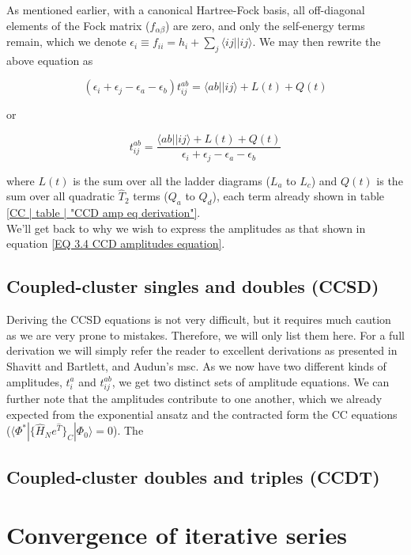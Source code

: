 \documentclass[10pt]{report}
\begin{document}
	As mentioned earlier, with a canonical Hartree-Fock basis, all off-diagonal elements of the Fock matrix ($f_{\alpha\beta}$) are zero, and only the self-energy terms remain, which we denote $\epsilon_i \equiv f_{ii} = h_i + \sum_{j}\langle ij||ij\rangle$. We may then rewrite the above equation as
	
	\begin{equation}
		(\epsilon_i+\epsilon_j-\epsilon_a-\epsilon_b)t_{ij}^{ab} = \langle ab||ij\rangle + L(t) + Q(t)
	\end{equation}
	
	or
	
	\begin{equation}
		t_{ij}^{ab} = \frac{\langle ab||ij\rangle + L(t) + Q(t)}{\epsilon_i+\epsilon_j-\epsilon_a-\epsilon_b}
		\label{EQ 3.4 CCD amplitudes equation}
	\end{equation}
	
	where $L(t)$ is the sum over all the ladder diagrams ($L_a$ to $L_c$) and $Q(t)$ is the sum over all quadratic $\hat{T}_2$ terms ($Q_a$ to $Q_d$), each term already shown in table \ref{CC | table | "CCD amp eq derivation"}.\\
	
	We'll get back to why we wish to express the amplitudes as that shown in equation \ref{EQ 3.4 CCD amplitudes equation}.
	
	\subsection{Coupled-cluster singles and doubles (CCSD)}
	Deriving the CCSD equations is not very difficult, but it requires much caution as we are very prone to mistakes. Therefore, we will only list them here. For a full derivation we will simply refer the reader to excellent derivations as presented in Shavitt and Bartlett, and Audun's msc. As we now have two different kinds of amplitudes, $t_i^a$ and $t_{ij}^{ab}$, we get two distinct sets of amplitude equations. We can further note that the amplitudes contribute to one another, which we already expected from the exponential ansatz and the contracted form the CC equations ($\langle\Phi^*|\{\hat{H}_Ne^{\hat{T}}\}_C|\Phi_0\rangle = 0$). The 
	
	\subsection{Coupled-cluster doubles and triples (CCDT)}
	
	\section{Convergence of iterative series}
	
\end{document}
